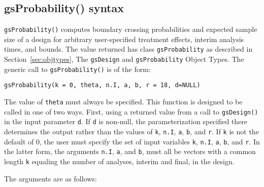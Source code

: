 \subsection{gsProbability() syntax}

\texttt{gsProbability()} computes boundary crossing probabilities and expected
sample size of a design for arbitrary user-specified treatment effects,
interim analysis times, and bounds. The value returned has class
\texttt{gsProbability} as described in 
Section~\ref{sec:objtypes}, The \texttt{gsDesign} and \texttt{gsProbability} 
Object Types. The generic call to \texttt{gsProbability()} is of the form:

\bigskip

\texttt{gsProbability(k = 0, theta, n.I, a, b, r = 18, d=NULL)}

\bigskip

The value of \texttt{theta} must always be specified. This function is
designed to be called in one of two ways. First, using a returned value from a
call to \texttt{gsDesign()} in the input parameter \texttt{d}. If \texttt{d}
is non-null, the parameterization specified there determines the output rather
than the values of \texttt{k}, \texttt{n.I}, \texttt{a}, \texttt{b}, and
\texttt{r}. If \texttt{k} is not the default of 0, the user must specify the
set of input variables \texttt{k}, \texttt{n.I}, \texttt{a}, \texttt{b}, and
\texttt{r}. In the latter form, the arguments \texttt{n.I}, \texttt{a}, and
\texttt{b}, must all be vectors with a common length \texttt{k} equaling the
number of analyses, interim and final, in the design.

The arguments are as follows:

